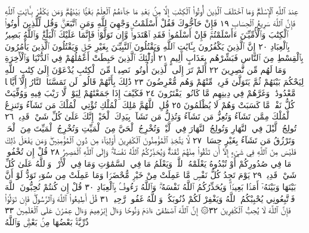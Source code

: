 عِندَ ٱللَّهِ ٱلْإِسْلَٰمُۗ وَمَا ٱخْتَلَفَ ٱلَّذِينَ أُوتُوا۟ ٱلْكِتَٰبَ
إِلَّا مِنۢ بَعْدِ مَا جَآءَهُمُ ٱلْعِلْمُ بَغْيَۢا بَيْنَهُمْۗ وَمَن يَكْفُرْ
بِـَٔايَٰتِ ٱللَّهِ فَإِنَّ ٱللَّهَ سَرِيعُ ٱلْحِسَابِ ١٩ فَإِنْ حَآجُّوكَ
فَقُلْ أَسْلَمْتُ وَجْهِيَ لِلَّهِ وَمَنِ ٱتَّبَعَنِۗ وَقُل لِّلَّذِينَ أُوتُوا۟
ٱلْكِتَٰبَ وَٱلْأُمِّيِّـۧنَ ءَأَسْلَمْتُمْۚ فَإِنْ أَسْلَمُوا۟ فَقَدِ ٱهْتَدَوا۟ۖ
وَّإِن تَوَلَّوْا۟ فَإِنَّمَا عَلَيْكَ ٱلْبَلَٰغُۗ وَٱللَّهُ بَصِيرُۢ بِٱلْعِبَادِ ٢٠
إِنَّ ٱلَّذِينَ يَكْفُرُونَ بِـَٔايَٰتِ ٱللَّهِ وَيَقْتُلُونَ ٱلنَّبِيِّـۧنَ
بِغَيْرِ حَقࣲّ وَيَقْتُلُونَ ٱلَّذِينَ يَأْمُرُونَ بِٱلْقِسْطِ مِنَ
ٱلنَّاسِ فَبَشِّرْهُم بِعَذَابٍ أَلِيمٍ ٢١ أُو۟لَٰٓئِكَ ٱلَّذِينَ حَبِطَتْ
أَعْمَٰلُهُمْ فِي ٱلدُّنْيَا وَٱلْأٓخِرَةِ وَمَا لَهُم مِّن نَّٰصِرِينَ ٢٢
أَلَمْ تَرَ إِلَى ٱلَّذِينَ أُوتُوا۟ نَصِيبࣰا مِّنَ ٱلْكِتَٰبِ يُدْعَوْنَ إِلَىٰ كِتَٰبِ
ٱللَّهِ لِيَحْكُمَ بَيْنَهُمْ ثُمَّ يَتَوَلَّىٰ فَرِيقࣱ مِّنْهُمْ وَهُم مُّعْرِضُونَ ٢٣
ذَٰلِكَ بِأَنَّهُمْ قَالُوا۟ لَن تَمَسَّنَا ٱلنَّارُ إِلَّآ أَيَّامࣰا مَّعْدُودَٰتࣲۖ
وَغَرَّهُمْ فِي دِينِهِم مَّا كَانُوا۟ يَفْتَرُونَ ٢٤ فَكَيْفَ إِذَا جَمَعْنَٰهُمْ
لِيَوْمࣲ لَّا رَيْبَ فِيهِ وَوُفِّيَتْ كُلُّ نَفْسࣲ مَّا كَسَبَتْ وَهُمْ
لَا يُظْلَمُونَ ٢٥ قُلِ ٱللَّهُمَّ مَٰلِكَ ٱلْمُلْكِ تُؤْتِي ٱلْمُلْكَ مَن
تَشَآءُ وَتَنزِعُ ٱلْمُلْكَ مِمَّن تَشَآءُ وَتُعِزُّ مَن تَشَآءُ وَتُذِلُّ مَن
تَشَآءُۖ بِيَدِكَ ٱلْخَيْرُۖ إِنَّكَ عَلَىٰ كُلِّ شَيْءࣲ قَدِيرࣱ ٢٦ تُولِجُ ٱلَّيْلَ
فِي ٱلنَّهَارِ وَتُولِجُ ٱلنَّهَارَ فِي ٱلَّيْلِۖ وَتُخْرِجُ ٱلْحَيَّ مِنَ ٱلْمَيِّتِ
وَتُخْرِجُ ٱلْمَيِّتَ مِنَ ٱلْحَيِّۖ وَتَرْزُقُ مَن تَشَآءُ بِغَيْرِ حِسَابࣲ ٢٧
لَّا يَتَّخِذِ ٱلْمُؤْمِنُونَ ٱلْكَٰفِرِينَ أَوْلِيَآءَ مِن دُونِ ٱلْمُؤْمِنِينَۖ
وَمَن يَفْعَلْ ذَٰلِكَ فَلَيْسَ مِنَ ٱللَّهِ فِي شَيْءٍ إِلَّآ أَن تَتَّقُوا۟ مِنْهُمْ
تُقَىٰةࣰۗ وَيُحَذِّرُكُمُ ٱللَّهُ نَفْسَهُۥۗ وَإِلَى ٱللَّهِ ٱلْمَصِيرُ ٢٨ قُلْ
إِن تُخْفُوا۟ مَا فِي صُدُورِكُمْ أَوْ تُبْدُوهُ يَعْلَمْهُ ٱللَّهُۗ وَيَعْلَمُ
مَا فِي ٱلسَّمَٰوَٰتِ وَمَا فِي ٱلْأَرْضِۗ وَٱللَّهُ عَلَىٰ كُلِّ شَيْءࣲ قَدِيرࣱ ٢٩
يَوْمَ تَجِدُ كُلُّ نَفْسࣲ مَّا عَمِلَتْ مِنْ خَيْرࣲ مُّحْضَرࣰا وَمَا عَمِلَتْ
مِن سُوٓءࣲ تَوَدُّ لَوْ أَنَّ بَيْنَهَا وَبَيْنَهُۥٓ أَمَدَۢا بَعِيدࣰاۗ وَيُحَذِّرُكُمُ ٱللَّهُ
نَفْسَهُۥۗ وَٱللَّهُ رَءُوفُۢ بِٱلْعِبَادِ ٣٠ قُلْ إِن كُنتُمْ تُحِبُّونَ ٱللَّهَ
فَٱتَّبِعُونِي يُحْبِبْكُمُ ٱللَّهُ وَيَغْفِرْ لَكُمْ ذُنُوبَكُمْۚ وَٱللَّهُ غَفُورࣱ
رَّحِيمࣱ ٣١ قُلْ أَطِيعُوا۟ ٱللَّهَ وَٱلرَّسُولَۖ فَإِن تَوَلَّوْا۟ فَإِنَّ ٱللَّهَ لَا يُحِبُّ
ٱلْكَٰفِرِينَ ٣٢۞ إِنَّ ٱللَّهَ ٱصْطَفَىٰٓ ءَادَمَ وَنُوحࣰا وَءَالَ إِبْرَٰهِيمَ
وَءَالَ عِمْرَٰنَ عَلَى ٱلْعَٰلَمِينَ ٣٣ ذُرِّيَّةَۢ بَعْضُهَا مِنۢ بَعْضࣲۗ وَٱللَّهُ

